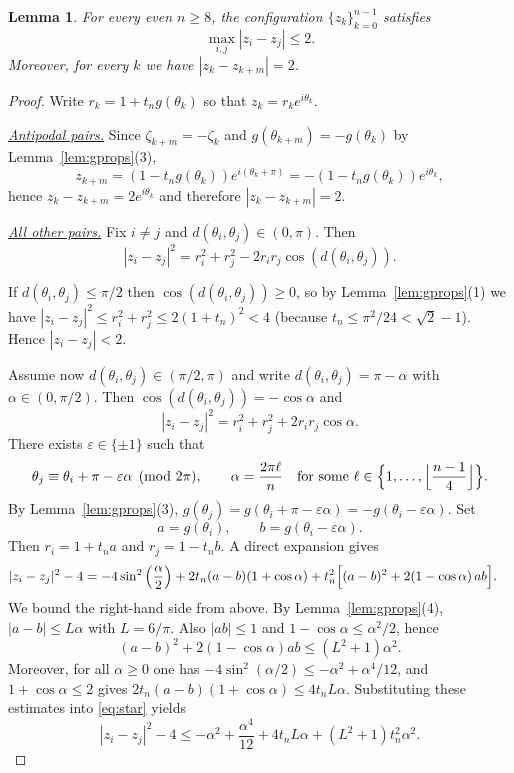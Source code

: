 \documentclass{article}
\newtheorem{lem}[thr]{Lemma}
\theoremstyle{definition}
\let\le\leqslant
\let\ge\geqslant
\begin{document}
\begin{lem}\label{lem:diameter}
For every even $n\ge 8$, the configuration $\{z_k\}_{k=0}^{n-1}$ satisfies
\[
\max_{i,j}|z_i-z_j|\le 2.
\]
Moreover, for every $k$ we have $|z_k-z_{k+m}|=2$.
\end{lem}

\begin{proof}
Write $r_k=1+t_n g(\theta_k)$ so that $z_k=r_k e^{i\theta_k}$.

\medskip\noindent\underline{\emph{Antipodal pairs.}}
Since $\zeta_{k+m}=-\zeta_k$ and $g(\theta_{k+m})=-g(\theta_k)$ by Lemma~\ref{lem:gprops}(3),
\[
z_{k+m}=(1-t_n g(\theta_k)) e^{i(\theta_k+\pi)}=-(1-t_n g(\theta_k))e^{i\theta_k},
\]
hence $z_k-z_{k+m}=2e^{i\theta_k}$ and therefore $|z_k-z_{k+m}|=2$.

\medskip\noindent\underline{\emph{All other pairs.}}
Fix $i\neq j$ and $d(\theta_i,\theta_j)\in(0,\pi)$. Then
\[
|z_i-z_j|^2=r_i^2+r_j^2-2r_ir_j\cos(d(\theta_i,\theta_j)).
\]

If $d(\theta_i,\theta_j)\le \pi/2$ then $\cos(d(\theta_i,\theta_j))\ge0$, so by Lemma~\ref{lem:gprops}(1) we have $|z_i-z_j|^2\le r_i^2+r_j^2\le 2(1+t_n)^2<4$
(because $t_n\le \pi^2/24<\sqrt2-1$). Hence $|z_i-z_j|<2$.

Assume now $d(\theta_i,\theta_j)\in(\pi/2,\pi)$ and write $d(\theta_i,\theta_j)=\pi-\alpha$ with $\alpha\in(0,\pi/2)$.
Then $\cos(d(\theta_i,\theta_j))=-\cos\alpha$ and
\[
|z_i-z_j|^2=r_i^2+r_j^2+2r_ir_j\cos\alpha.
\]
There exists $\varepsilon\in\{\pm1\}$ such that
\[
\theta_j\equiv \theta_i+\pi-\varepsilon\alpha\pmod{2\pi},
\qquad \alpha=\frac{2\pi\ell}{n}
\quad\text{for some }\ell\in\Bigl\{1,\dots,\Bigl\lfloor\frac{n-1}{4}\Bigr\rfloor\Bigr\}.
\]
By Lemma~\ref{lem:gprops}(3),
$g(\theta_j)=g(\theta_i+\pi-\varepsilon\alpha)=-g(\theta_i-\varepsilon\alpha)$.
Set
\[
a=g(\theta_i),\qquad b=g(\theta_i-\varepsilon\alpha).
\]
Then $r_i=1+t_n a$ and $r_j=1-t_n b$. A direct expansion gives
\begin{align}
|z_i-z_j|^2-4
&= -4\sin^2\left(\frac{\alpha}{2}\right)
+2t_n(a-b)(1+\cos\alpha)
+t_n^2\Bigl[(a-b)^2+2(1-\cos\alpha)\,ab\Bigr].
\label{eq:star}
\end{align}
We bound the right-hand side from above.
By Lemma~\ref{lem:gprops}(4), $|a-b|\le L\alpha$ with $L=6/\pi$.
Also $|ab|\le1$ and $1-\cos\alpha\le \alpha^2/2$, hence
\[
(a-b)^2+2(1-\cos\alpha)ab\le (L^2+1)\alpha^2.
\]
Moreover, for all $\alpha\ge0$ one has $-4\sin^2(\alpha/2)\le -\alpha^2+\alpha^4/12$,
and $1+\cos\alpha\le2$ gives $2t_n(a-b)(1+\cos\alpha)\le 4t_nL\alpha$.
Substituting these estimates into \eqref{eq:star} yields
\begin{equation}\label{eq:hbound}
|z_i-z_j|^2-4
\le
-\alpha^2+\frac{\alpha^4}{12}+4t_nL\alpha+(L^2+1)t_n^2\alpha^2.
\end{equation}


\end{proof}
\end{document}
